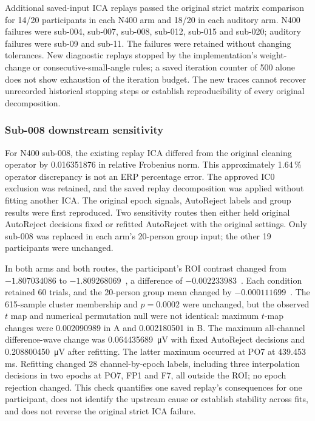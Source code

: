 Additional saved-input ICA replays passed the original strict matrix comparison for 14/20 participants in each N400 arm and 18/20 in each auditory arm. N400 failures were sub-004, sub-007, sub-008, sub-012, sub-015 and sub-020; auditory failures were sub-09 and sub-11. The failures were retained without changing tolerances. New diagnostic replays stopped by the implementation's weight-change or consecutive-small-angle rules; a saved iteration counter of 500 alone does not show exhaustion of the iteration budget. The new traces cannot recover unrecorded historical stopping steps or establish reproducibility of every original decomposition.

\subsubsection*{Sub-008 downstream sensitivity}

For N400 sub-008, the existing replay ICA differed from the original cleaning operator by 0.016351876 in relative Frobenius norm. This approximately 1.64\,\% operator discrepancy is not an ERP percentage error. The approved IC0 exclusion was retained, and the saved replay decomposition was applied without fitting another ICA. The original epoch signals, AutoReject labels and group results were first reproduced. Two sensitivity routes then either held original AutoReject decisions fixed or refitted AutoReject with the original settings. Only sub-008 was replaced in each arm's 20-person group input; the other 19 participants were unchanged.

In both arms and both routes, the participant's ROI contrast changed from \(-1.807034086\) to \(-1.809268069\)~\uV, a difference of \(-0.002233983\)~\uV. Each condition retained 60 trials, and the 20-person group mean changed by \(-0.000111699\)~\uV. The 615-sample cluster membership and $p=0.0002$ were unchanged, but the observed $t$ map and numerical permutation null were not identical: maximum $t$-map changes were 0.002090989 in A and 0.002180501 in B. The maximum all-channel difference-wave change was \SI{0.064435689}{\uV} with fixed AutoReject decisions and \SI{0.208800450}{\uV} after refitting. The latter maximum occurred at PO7 at 439.453\,ms. Refitting changed 28 channel-by-epoch labels, including three interpolation decisions in two epochs at PO7, FP1 and F7, all outside the ROI; no epoch rejection changed. This check quantifies one saved replay's consequences for one participant, does not identify the upstream cause or establish stability across fits, and does not reverse the original strict ICA failure.

